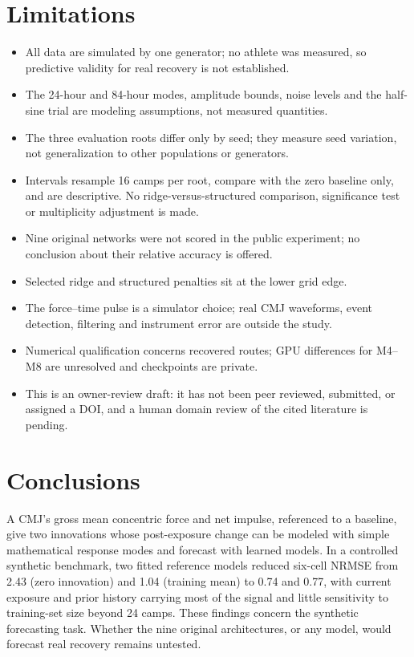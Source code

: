 \documentclass[12pt,a4paper]{article}
\begin{document}
\section{Limitations}
\begin{itemize}\setlength{\itemsep}{0pt}
\item All data are simulated by one generator; no athlete was measured, so predictive validity for real recovery is not established.
\item The 24-hour and 84-hour modes, amplitude bounds, noise levels and the half-sine trial are modeling assumptions, not measured quantities.
\item The three evaluation roots differ only by seed; they measure seed variation, not generalization to other populations or generators.
\item Intervals resample 16 camps per root, compare with the zero baseline only, and are descriptive. No ridge-versus-structured comparison, significance test or multiplicity adjustment is made.
\item Nine original networks were not scored in the public experiment; no conclusion about their relative accuracy is offered.
\item Selected ridge and structured penalties sit at the lower grid edge.
\item The force--time pulse is a simulator choice; real CMJ waveforms, event detection, filtering and instrument error are outside the study.
\item Numerical qualification concerns recovered routes; GPU differences for M4--M8 are unresolved and checkpoints are private.
\item This is an owner-review draft: it has not been peer reviewed, submitted, or assigned a DOI, and a human domain review of the cited literature is pending.
\end{itemize}

\section{Conclusions}
A CMJ's gross mean concentric force and net impulse, referenced to a baseline, give two innovations whose post-exposure change can be modeled with simple mathematical response modes and forecast with learned models. In a controlled synthetic benchmark, two fitted reference models reduced six-cell NRMSE from 2.43 (zero innovation) and 1.04 (training mean) to 0.74 and 0.77, with current exposure and prior history carrying most of the signal and little sensitivity to training-set size beyond 24 camps. These findings concern the synthetic forecasting task. Whether the nine original architectures, or any model, would forecast real recovery remains untested.
\end{document}
